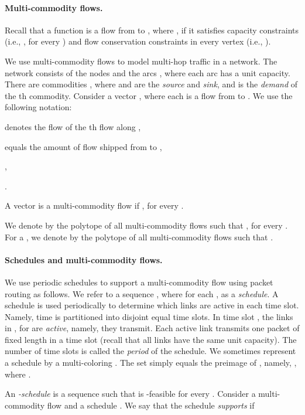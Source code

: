 \documentclass[11pt]{article}
\newenvironment{proof sketch}{\noindent {\bf Proof sketch:} }{\hfill \qed}
\newcommand{\sinr}{\text{\sc{sinr}}}
\begin{document}
\paragraph{Multi-commodity flows.}
Recall that a function 
is a flow from  to , where , if it satisfies capacity
constraints (i.e., , for every ) and flow conservation
constraints in every vertex  (i.e., ).

We use multi-commodity flows to model multi-hop traffic in a network.
The network consists of the nodes  and the arcs , where
each arc has a unit capacity.  There are  commodities
, where  and  are the \emph{source} and
\emph{sink}, and  is the \emph{demand} of the th commodity.
Consider a vector , where each
 is a flow from  to .
We use the following notation:
\begin{inparaenum}[(i)]
\item  denotes the flow of the th flow along ,
\item  equals the amount of flow shipped from  to ,
\item ,
\item .
\end{inparaenum}
A vector  is a multi-commodity flow if ,
for every .

We denote by  the polytope of all multi-commodity flows 
such that , for every .
For a , we denote by  the polytope of
all multi-commodity flows such that .

\paragraph{Schedules and multi-commodity flows.}
We use periodic schedules to support a multi-commodity flow using
packet routing as follows.  We refer to a sequence
, where  for each , as a
\emph{schedule}. A schedule is used periodically to determine which
links are active in each time slot.  Namely, time is partitioned into
disjoint equal time slots.  In time slot , the links in , for
 are \emph{active}, namely, they transmit.  Each active
link transmits one packet of fixed length in a time slot (recall that
all links have the same unit capacity).  The number of time slots 
is called the \emph{period} of the schedule. We sometimes represent a
schedule  by a multi-coloring .  The set  simply equals the
preimage of , namely, , where
.

An \emph{\sinr-schedule} is a sequence
 such that  is \sinr-feasible for every .
Consider a multi-commodity flow  and a
schedule . We say that the schedule 
\emph{supports}  if
\end{document}
